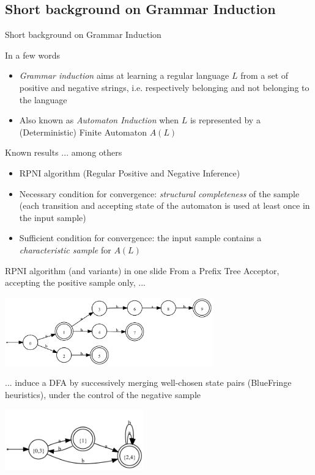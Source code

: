 \documentclass[11pt]{beamer}
\begin{document}
\subsection{Short background on Grammar Induction}
\begin{frame}{Short background on Grammar Induction}
	\begin{block}{In a few words}
		\begin{itemize}
		 	\item \emph{Grammar induction} aims at learning a regular language $L$ from a set of positive and negative strings,
				 i.e. respectively belonging and not belonging to the language
			\item Also known as \emph{Automaton Induction} when $L$ is represented by a (Deterministic) Finite Automaton $A(L)$
		\end{itemize}
	\end{block}
	\begin{block}{Known results ... among others}
		\begin{itemize}
			\item RPNI algorithm (Regular Positive and Negative Inference)
			\item Necessary condition for convergence: \emph{structural completeness} of the sample (each transition and accepting state 
				of the automaton is used at least once in the input sample)
			\item Sufficient condition for convergence: the input sample contains a \emph{characteristic sample} for $A(L)$
		\end{itemize}
	\end{block}
\end{frame}

\begin{frame}{RPNI algorithm (and variants) in one slide}
	From a Prefix Tree Acceptor, accepting the positive sample only, ...
	\begin{center}
		\includegraphics[width=9cm]{images/dfa_merge_0.pdf}
	\end{center}
	... induce a DFA by successively merging well-chosen state pairs (BlueFringe heuristics), under the control of the negative sample
	\begin{center}
		\includegraphics[width=6cm]{images/dfa_merge_3.pdf}
	\end{center}
\end{frame}
\end{document}
